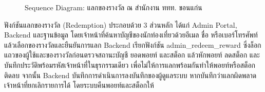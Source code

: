 \begin{figure}[H]
\centering
{}
\caption{Sequence Diagram: แลกของรางวัล ณ สำนักงาน ททท. ขอนแก่น}
\label{fig:sequence_point_redeem}
\end{figure}

ฟังก์ชันแลกของรางวัล (Redemption) ประกอบด้วย 3 ส่วนหลัก ได้แก่ Admin Portal, Backend และฐานข้อมูล โดยเจ้าหน้าที่ค้นหาบัญชีของนักท่องเที่ยวด้วยอีเมล ชื่อ หรือเบอร์โทรศัพท์ แล้วเลือกของรางวัลและยืนยันการแลก Backend เรียกฟังก์ชัน admin\_redeem\_reward ซึ่งล็อกแถวของผู้ใช้และของรางวัลก่อนตรวจสถานะบัญชี ยอดพอยท์ และสต็อก แล้วหักพอยท์ ลดสต็อก และบันทึกประวัติพร้อมรหัสเจ้าหน้าที่ในธุรกรรมเดียว เพื่อไม่ให้การแลกพร้อมกันทำให้พอยท์หรือสต็อกติดลบ จากนั้น Backend บันทึกการดำเนินการลงบันทึกของผู้ดูแลระบบ หากบันทึกว่าแลกผิดพลาด เจ้าหน้าที่ยกเลิกรายการได้ โดยระบบคืนพอยท์และสต็อกให้

